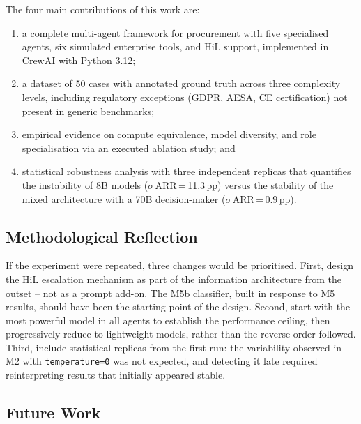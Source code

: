 \documentclass[preprint,12pt,authoryear]{elsarticle}
\begin{document}
The four main contributions of this work are:
\begin{enumerate}[label=(\arabic*)]
  \item a complete multi-agent framework for procurement with five specialised
        agents, six simulated enterprise tools, and HiL support, implemented in
        CrewAI with Python 3.12;
  \item a dataset of 50 cases with annotated ground truth across three
        complexity levels, including regulatory exceptions (GDPR, AESA, CE
        certification) not present in generic benchmarks;
  \item empirical evidence on compute equivalence, model diversity, and role
        specialisation via an executed ablation study; and
  \item statistical robustness analysis with three independent replicas that
        quantifies the instability of 8B models ($\sigma$\,ARR\,=\,11.3\,pp)
        versus the stability of the mixed architecture with a 70B decision-maker
        ($\sigma$\,ARR\,=\,0.9\,pp).
\end{enumerate}

\subsection{Methodological Reflection}

If the experiment were repeated, three changes would be prioritised.
First, design the HiL escalation mechanism as part of the information
architecture from the outset -- not as a prompt add-on.
The M5b classifier, built in response to M5 results, should have been the
starting point of the design.
Second, start with the most powerful model in all agents to establish the
performance ceiling, then progressively reduce to lightweight models, rather
than the reverse order followed.
Third, include statistical replicas from the first run: the variability observed
in M2 with \texttt{temperature=0} was not expected, and detecting it late
required reinterpreting results that initially appeared stable.

\subsection{Future Work}
\end{document}
